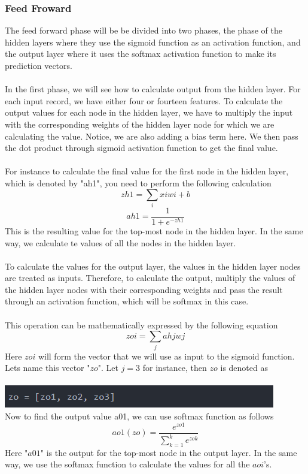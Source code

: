 \documentclass[11pt]{article}
\theoremstyle{definition}
\begin{document}
\subsubsection{Feed Froward}
The feed forward phase will be be divided into two phases, the phase of the hidden layers where they use the sigmoid function as an activation function, and the output layer where it uses the softmax activation function to make its prediction vectors.\\\\
In the first phase, we will see how to calculate output from the hidden layer. For each input record, we have either four or fourteen features. To calculate the output values for each node in the hidden layer, we have to multiply the input with the corresponding weights of the hidden layer node for which we are calculating the value. Notice, we are also adding a bias term here. We then pass the dot product through sigmoid activation function to get the final value. \\\\
For instance to calculate the final value for the first node in the hidden layer, which is denoted by "ah1", you need to perform the following calculation\\
$$
zh1=\sum_ixiwi+b
$$
$$
ah1=\frac{1}{1+e^{-zh1}}
$$
This is the resulting value for the top-most node in the hidden layer. In the same way, we calculate te values of all the nodes in the hidden layer.\\\\
To calculate the values for the output layer, the values in the hidden layer nodes are treated as inputs. Therefore, to calculate the output, multiply the values of the hidden layer nodes with their corresponding weights and pass the result through an activation function, which will be softmax in this case.\\\\
This operation can be mathematically expressed by the following equation
$$
zoi=\sum_jahjwj
$$
Here $zoi$ will form the vector that we will use as input to the sigmoid function. Lets name this vector "$zo$". Let $j=3$ for instance, then $zo$ is denoted as\\\\
\includegraphics[scale=1]{image3.PNG}\\
Now to find the output value a01, we can use softmax function as follows
$$
ao1(zo)=\frac{e^{zo1}}{\sum^k_{k=1}e^{zok}}
$$
Here "$a01$" is the output for the top-most node in the output layer. In the same way, we use the softmax function to calculate the values for all the $aoi$'s.
\end{document}
